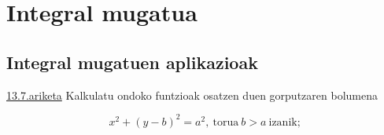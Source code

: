 \chapter{Integral mugatua}
\section{Integral mugatuen aplikazioak}
\underline{13.7.ariketa} Kalkulatu ondoko funtzioak osatzen duen gorputzaren bolumena

\begin{equation*}
    x^2+(y-b)^2=a^2,\ \text{torua}\ b>a \ \text{izanik;}
\end{equation*}